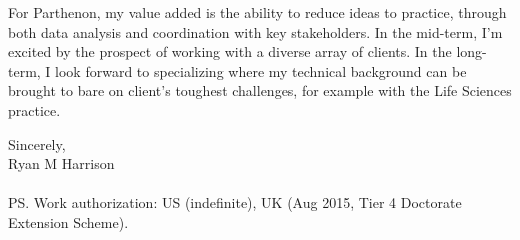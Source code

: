 \documentclass[a4paper]{../res}
\begin{document}
\begin{sloppypar}
\begin{resume}

For Parthenon, my value added is the ability to reduce ideas to practice, through both data analysis and coordination with key stakeholders. In the mid-term, I'm excited by the prospect of working with a diverse array of clients. In the long-term, I look forward to specializing where my technical background can be brought to bare on client's toughest challenges, for example with the Life Sciences practice.

Sincerely,
\\
Ryan M Harrison \\ \\
PS. Work authorization: US (indefinite), UK (Aug 2015, Tier 4 Doctorate Extension Scheme).

\end{resume} 
\end{sloppypar}
\end{document}
